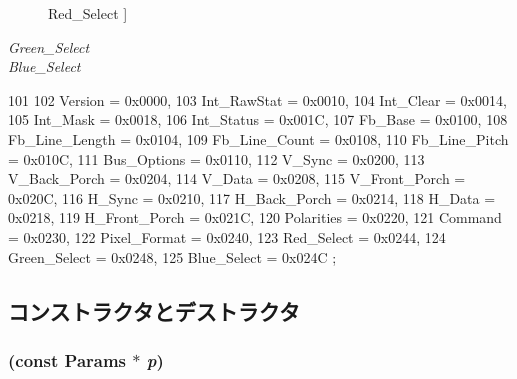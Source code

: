 \begin{Desc}
\begin{description}
{{Red\_\-Select}
\label{classHDLcd_a5589603d1462868f128ddcda455b167aa3c14c44e84578139168434c48cff7ae4}
}]\item[{\em 
\hypertarget{classHDLcd_a5589603d1462868f128ddcda455b167aa35c8bdcdce89f753d2e287a46bd09528}{
Green\_\-Select}
\label{classHDLcd_a5589603d1462868f128ddcda455b167aa35c8bdcdce89f753d2e287a46bd09528}
}]\item[{\em 
\hypertarget{classHDLcd_a5589603d1462868f128ddcda455b167aa7866c291b06c767b524c00d58fd7e0da}{
Blue\_\-Select}
\label{classHDLcd_a5589603d1462868f128ddcda455b167aa7866c291b06c767b524c00d58fd7e0da}
}]\end{description}
\end{Desc}




\begin{DoxyCode}
101                         {
102         Version          = 0x0000,
103         Int_RawStat      = 0x0010,
104         Int_Clear        = 0x0014,
105         Int_Mask         = 0x0018,
106         Int_Status       = 0x001C,
107         Fb_Base          = 0x0100,
108         Fb_Line_Length   = 0x0104,
109         Fb_Line_Count    = 0x0108,
110         Fb_Line_Pitch    = 0x010C,
111         Bus_Options      = 0x0110,
112         V_Sync           = 0x0200,
113         V_Back_Porch     = 0x0204,
114         V_Data           = 0x0208,
115         V_Front_Porch    = 0x020C,
116         H_Sync           = 0x0210,
117         H_Back_Porch     = 0x0214,
118         H_Data           = 0x0218,
119         H_Front_Porch    = 0x021C,
120         Polarities       = 0x0220,
121         Command          = 0x0230,
122         Pixel_Format     = 0x0240,
123         Red_Select       = 0x0244,
124         Green_Select     = 0x0248,
125         Blue_Select      = 0x024C };
\end{DoxyCode}


\subsection{コンストラクタとデストラクタ}
\hypertarget{classHDLcd_a02114caff8968787e64ab481aeb6ae09}{
\subsubsection[{HDLcd}]{ (const {\bf Params} $\ast$ {\em p})}}
\label{classHDLcd_a02114caff8968787e64ab481aeb6ae09}



